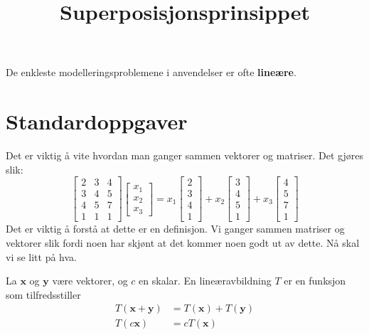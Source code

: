 
\title{Superposisjonsprinsippet}




\maketitle

De enkleste modelleringsproblemene i anvendelser er ofte \textbf{lineære}.



\section*{Standardoppgaver}

Det er viktig å vite hvordan man ganger sammen vektorer og matriser.
Det gjøres slik:
\[
\begin{bmatrix}
2 & 3 & 4 \\
3 & 4 & 5 \\
4 & 5 & 7 \\
1 & 1 & 1
\end{bmatrix}
\begin{bmatrix}
x_1 \\
x_2 \\
x_3
\end{bmatrix}
=
x_1
\begin{bmatrix}
2  \\
3  \\
4 \\
1
\end{bmatrix}
+
x_2
\begin{bmatrix}
 3  \\
4  \\
 5 \\
 1
\end{bmatrix}
+
x_3
\begin{bmatrix}
4 \\
5 \\
7 \\
1
\end{bmatrix}
\]
Det er viktig å forstå at dette er en definisjon. 
Vi ganger sammen matriser og vektorer slik fordi noen har skjønt at det kommer noen godt ut av dette. 
Nå skal vi se litt på hva.


\begin{tcolorbox}[colback=blue!10, title=Superposisjonsprinsippet]
La $\mathbf x$ og $\mathbf y$ være vektorer, 
og $c$ en skalar. 
En lineæravbildning $T$ er en funksjon som tilfredsstiller
\begin{align*}
T(\mathbf x+\mathbf y)&=T(\mathbf x)+T(\mathbf y) \\
T(c\mathbf x)&=cT(\mathbf x)
\end{align*}
\end{tcolorbox}


